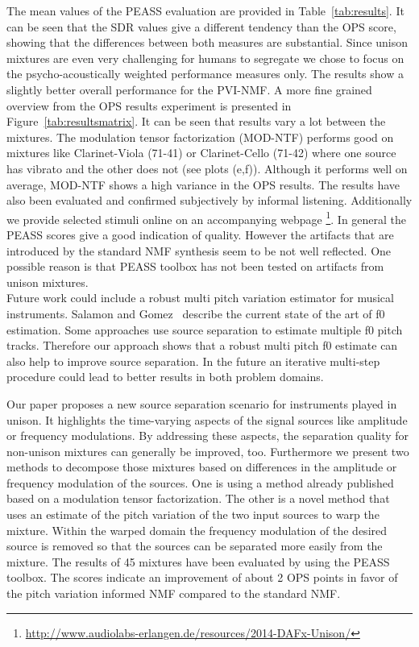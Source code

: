 The mean values of the PEASS evaluation are provided in Table~\ref{tab:results}. It can be seen that the SDR values give a different tendency than the OPS score, showing that the differences between both measures are substantial. Since unison mixtures are even very challenging for humans to segregate we chose to focus on the psycho-acoustically weighted performance measures only. The results show a slightly better overall performance for the PVI-NMF. A more fine grained overview from the OPS results experiment is presented in Figure~\ref{tab:resultsmatrix}. It can be seen that results vary a lot between the mixtures. The modulation tensor factorization (MOD-NTF) performs good on mixtures like Clarinet-Viola (71-41) or Clarinet-Cello (71-42)  where one source has vibrato and the other does not (see plots (e,f)). Although it performs well on average, MOD-NTF shows a high variance in the OPS results. The results have also been evaluated and confirmed subjectively by informal listening. Additionally we provide selected stimuli online on an accompanying webpage \footnote{\url{http://www.audiolabs-erlangen.de/resources/2014-DAFx-Unison/}}. In general the PEASS scores give a good indication of quality. However the artifacts that are introduced by the standard NMF synthesis seem to be not well reflected. One possible reason is that PEASS toolbox has not been tested on artifacts from unison mixtures. \\
Future work could include a robust multi pitch variation estimator for musical instruments. Salamon and Gomez~\cite{salamon12} describe the current state of the art of f0 estimation. Some approaches use source separation to estimate multiple f0 pitch tracks. Therefore our approach shows that a robust multi pitch f0 estimate can also help to improve source separation. In the future an iterative multi-step procedure could lead to better results in both problem domains.\par

Our paper proposes a new source separation scenario for instruments played in unison. It highlights the time-varying aspects of the signal sources like amplitude or frequency modulations. By addressing these aspects, the separation quality for non-unison mixtures can generally be improved, too.
Furthermore we present two methods to decompose those mixtures based on differences in the amplitude or frequency modulation of the sources. One is using a method already published based on a modulation tensor factorization. The other is a novel method that uses an estimate of the pitch variation of the two input sources to warp the mixture. Within the warped domain the frequency modulation of the desired source is removed so that the sources can be separated more easily from the mixture. The results of 45 mixtures have been evaluated by using the PEASS toolbox. The scores indicate an improvement of about 2 OPS points in favor of the pitch variation informed NMF compared to the standard NMF.

